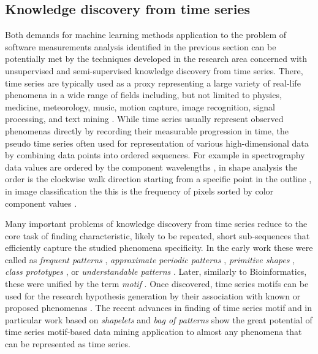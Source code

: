 %
%
\subsection{Knowledge discovery from time series}
Both demands for machine learning methods application to the problem of software measurements analysis
identified in the previous section can be potentially met by the techniques developed in the research 
area concerned with unsupervised and semi-supervised knowledge discovery from time series.
There, time series are typically used as a proxy representing a large variety of real-life 
phenomena in a wide range of fields including, but not limited to physics, medicine, meteorology, music, 
motion capture, image recognition, signal processing, and text mining \cite{citeulike:11796594}. 
While time series usually represent observed phenomenas directly by recording their measurable 
progression in time, the pseudo time series often used for representation of various high-dimensional 
data by combining data points into ordered sequences. 
For example in spectrography data values are ordered by the component wavelengths \cite{citeulike:12550833},
in shape analysis the order is the clockwise walk direction starting from a specific point in the outline 
\cite{citeulike:12550835}, in image classification the this is the frequency of pixels sorted by color component 
values \cite{citeulike:2900542}.

Many important problems of knowledge discovery from time series reduce to the core task of finding 
characteristic, likely to be repeated, short sub-sequences that efficiently capture the studied 
phenomena specificity. In the early work these were called as 
\textit{frequent patterns} \cite{citeulike:5159615}, 
\textit{approximate periodic patterns} \cite{citeulike:1959582},
\textit{primitive shapes} \cite{citeulike:5898869}, 
\textit{class prototypes} \cite{citeulike:4406444}, 
or \textit{understandable patterns} \cite{citeulike:3978076}. 
Later, similarly to Bioinformatics, these were unified by the term \textit{motif} \cite{citeulike:3977965}.
Once discovered, time series motifs can be used for the research hypothesis generation by their association 
with known or proposed phenomenas \cite{citeulike:3977965}. 
The recent advances in finding of time series motif and in particular work based on \textit{shapelets} 
\cite{citeulike:7344347} \cite{citeulike:11957982} \cite{citeulike:12552293} and \textit{bag of patterns} 
\cite{citeulike:10525778} show the great potential of time series motif-based data mining application
to almost any phenomena that can be represented as time series.

